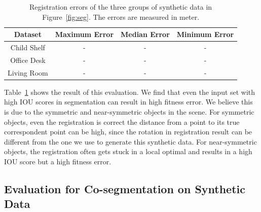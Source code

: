 \begin{table}
	\centering
	\caption{Registration errors of the three groups of synthetic data in Figure~\ref{fig:seg}. The errors are measured in meter. }
	\begin{tabular}{c c c c}
		Dataset & Maximum Error & Median Error & Minimum Error \\
		\hline
		Child Shelf & - & - & - \\   
		Office Desk & -  & - & - \\
		Living Room & -  & - & -\\
	\end{tabular}
	\label{tab:regerror}
\end{table}


Table~\ref{tab:regerror} shows the result of this evaluation.
%
We find that even the input set with high IOU scores in segmentation can result in high fitness error. We believe this is due to the symmetric and near-symmetric objects in the scene. For symmetric objects, even the registration is correct the distance from a point to its true correspondent point can be high, since the rotation in registration result can be different from the one we use to generate this synthetic data. For near-symmetric objects, the registration often gets stuck in a local optimal and results in a high IOU score but a high fitness error.


\subsection{Evaluation for Co-segmentation on Synthetic Data}



